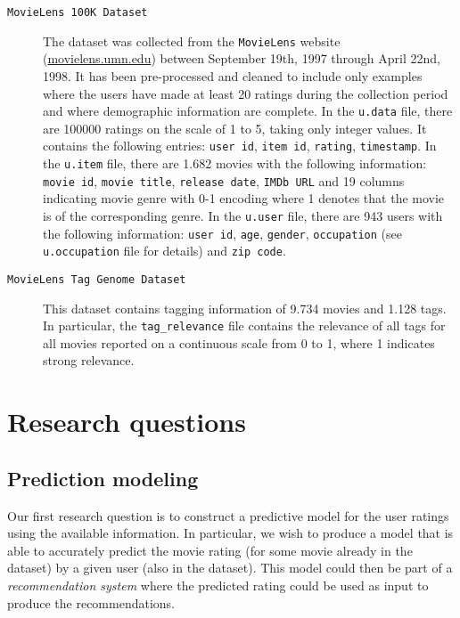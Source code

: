 \documentclass[bj, preprint]{imsart}
\begin{document}
\begin{description}
	\item[\texttt{MovieLens 100K Dataset}] 
	The dataset was collected from the \texttt{MovieLens} website (\url{movielens.umn.edu}) between September 19th, 1997 through April 22nd, 1998. 
	It has been pre-processed and cleaned to include only examples where the users have made at least 20 ratings during the collection period and where demographic information are complete. 
	In the \texttt{u.data} file, there are \num{100000} ratings on the scale of 1 to 5, taking only integer values. 
	It contains the following entries: \texttt{user id}, \texttt{item id}, \texttt{rating}, \texttt{timestamp}. 
	In the \texttt{u.item} file, there are \num{1,682} movies with the following information: \texttt{movie id}, \texttt{movie title}, \texttt{release date}, \texttt{IMDb URL} and 19 columns indicating movie genre with 0-1 encoding where 1 denotes that the movie is of the corresponding genre. 
	In the \texttt{u.user} file, there are \num{943} users with the following information: \texttt{user id}, \texttt{age}, \texttt{gender}, \texttt{occupation} (see \texttt{u.occupation} file for details) and \texttt{zip code}.
	\item[\texttt{MovieLens Tag Genome Dataset}] 
	This dataset contains tagging information of \num{9,734} movies and \num{1,128} tags. 
	In particular, the \texttt{tag\_relevance} file contains the relevance of all tags for all movies reported on a continuous scale from 0 to 1, where 1 indicates strong relevance.
\end{description}


\section{Research questions}\label{sec:setting}

\subsection{Prediction modeling}

Our first research question is to construct a predictive model for the user ratings using the available information. In particular, we wish to produce a model that is able to accurately predict the movie rating (for some movie already in the dataset) by a given user (also in the dataset). This model could then be part of a \textit{recommendation system} where the predicted rating could be used as input to produce the recommendations.
\end{document}
